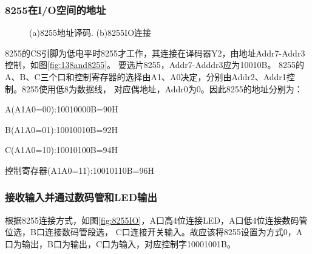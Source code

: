 \documentclass[12pt, a4paper, oneside]{ctexart}
\begin{document}
    \subsubsection{8255在I/O空间的地址}

    \begin{figure}[!h]
        \centering
        \hfil
        \caption{(a)8255地址译码. (b)8255IO连接}
    \end{figure} 

    8255的$\overline{\text{CS}}$引脚为低电平时8255才工作，其连接在译码器Y2，由地址Addr7-Addr3控制，如图\ref{fig:138and8255}。
    要选片8255，Addr7-Adddr3应为10010B。
    8255的A、B、C三个口和控制寄存器的选择由A1、A0决定，分别由Addr2、Addr1控制。8255使用低8为数据线，
    对应偶地址，Addr0为0。因此8255的地址分别为：

    A(A1A0=00):10010000B=90H

    B(A1A0=01):10010010B=92H

    C(A1A0=10):10010100B=94H

    控制寄存器(A1A0=11):10010110B=96H
    \subsubsection{接收输入并通过数码管和LED输出}
    根据8255连接方式，如图\ref{fig:8255IO}，A口高4位连接LED，A口低4位连接数码管位选，B口连接数码管段选，
    C口连接开关输入。故应该将8255设置为方式0，A口为输出，B口为输出，C口为输入，对应控制字10001001B。
\end{document}
